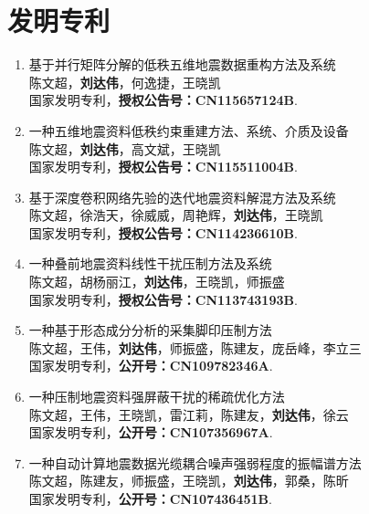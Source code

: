 \documentclass[11pt,a4paper]{article}
\newcommand{\me}[1]{\textbf{#1}}
\begin{document}
\section{发明专利}
\begin{enumerate}[leftmargin=1.5em, itemsep=0pt, topsep=2pt]
    \item 基于并行矩阵分解的低秩五维地震数据重构方法及系统 \\
    陈文超，\me{刘达伟}，何逸捷，王晓凯 \\
    国家发明专利，\textbf{授权公告号：CN115657124B}.
    \item 一种五维地震资料低秩约束重建方法、系统、介质及设备 \\
    陈文超，\me{刘达伟}，高文斌，王晓凯 \\
    国家发明专利，\textbf{授权公告号：CN115511004B}.
    \item 基于深度卷积网络先验的迭代地震资料解混方法及系统 \\
    陈文超，徐浩天，徐威威，周艳辉，\me{刘达伟}，王晓凯 \\
    国家发明专利，\textbf{授权公告号：CN114236610B}.
    \item 一种叠前地震资料线性干扰压制方法及系统 \\
    陈文超，胡杨丽江，\me{刘达伟}，王晓凯，师振盛 \\
    国家发明专利，\textbf{授权公告号：CN113743193B}.
    \item 一种基于形态成分分析的采集脚印压制方法 \\
    陈文超，王伟，\me{刘达伟}，师振盛，陈建友，庞岳峰，李立三 \\
    国家发明专利，\textbf{公开号：CN109782346A}.
    \item 一种压制地震资料强屏蔽干扰的稀疏优化方法 \\
    陈文超，王伟，王晓凯，雷江莉，陈建友，\me{刘达伟}，徐云 \\
    国家发明专利，\textbf{公开号：CN107356967A}.
    \item 一种自动计算地震数据光缆耦合噪声强弱程度的振幅谱方法 \\
    陈文超，陈建友，师振盛，王晓凯，\me{刘达伟}，郭桑，陈昕 \\
    国家发明专利，\textbf{公开号：CN107436451B}.
\end{enumerate}

\end{document}
